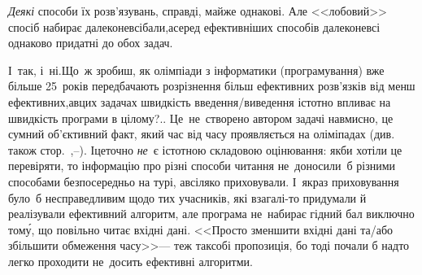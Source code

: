 \Tutorial
{}
\emph{Деякі} способи їх розв'язувань, справді, майже однакові. Але <<лобовий>> спосіб набирає далеко\nolinebreak[3] не\nolinebreak[3] всі\nolinebreak[2] бали,\linebreak[2] а\nolinebreak[3] серед ефективніших способів далеко\nolinebreak[3] не\nolinebreak[3] всі однаково придатні до обох задач. 

 І~так, і~ні.\linebreak[2] Що~ж зробиш, як олімпіади з інформатики (програмування) вже більше 25~років передбачають розрізнення більш ефективних розв'язків від менш ефективних,\linebreak[2] а\nolinebreak[2] %
в\nolinebreak[2] цих задачах швидкість введення/\nolinebreak[2]виве\-дення істотно впливає на швидкість програми в цілому\mbox{?.\hspace{0.1em}.} Це~не~створено автором задачі навмисно, це сумний об'єктивний факт, який час від часу проявляється на оліміпадах (див. також стор.~\pageref{text:io-streams-versus-scanf-printf},\nolinebreak[3] \mbox{\pageref{sec:omnipresent-numbers}--\pageref{text:omnipresent-numbers-end}}). І\nolinebreak[3] це\nolinebreak[2] точно \emph{не}~є істотною складовою оцінювання: якби хотіли це перевіряти, то інформацію про різні способи читання не~доносили~б різними способами безпосередньо на турі, а\nolinebreak[3] всіляко приховували. І~якраз приховування було~б несправедливим щодо тих учасників, які взагалі-то придумали й реалізували ефективний алгоритм, але програма не~набирає гідний бал виключно том\'{у}, що повільно читає вхідні дані. <<Просто зменшити вхідні дані та/або збільшити обмеження часу>>\nolinebreak[3] --- теж так\nolinebreak[3] собі пропозиція, бо тоді почали б надто легко проходити не~досить ефективні алгоритми.

